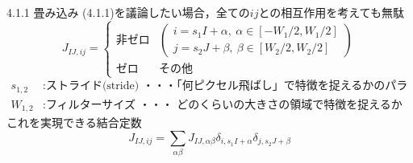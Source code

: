 \documentclass[dvipdfmx,8pt]{beamer}
\begin{document}
  \begin{frame}{4.1.1 畳み込み}
    (4.1.1)を議論したい場合，全ての$ij$との相互作用を考えても無駄
    \begin{equation}
      J_{IJ,ij}
      =\begin{cases}
        \text{非ゼロ} &\begin{pmatrix} i = s_1 I + \alpha, \ \alpha \in [-W_1/2,W_1/2]\\ j = s_2 J + \beta, \ \beta \in [W_2/2,W_2/2] \end{pmatrix}\\
        \text{ゼロ}   & \text{その他} \tag{4.1.3}
      \end{cases}
    \end{equation}
    \begin{align*}
      s_{1,2} &: \text{ストライド(stride) ・・・「何ピクセル飛ばし」で特徴を捉えるかのパラメータ}\\
      W_{1,2} &: \text{フィルターサイズ ・・・ どのくらいの大きさの領域で特徴を捉えるかのパラメータ}
    \end{align*}
    これを実現できる結合定数
    \begin{equation}
      J_{IJ,ij} = \sum_{\alpha \beta}J_{IJ,\alpha\beta}\delta_{i,s_1I + \alpha}\delta_{j,s_2J + \beta} \tag{4.1.4}
    \end{equation}
  \end{frame}
\end{document}
